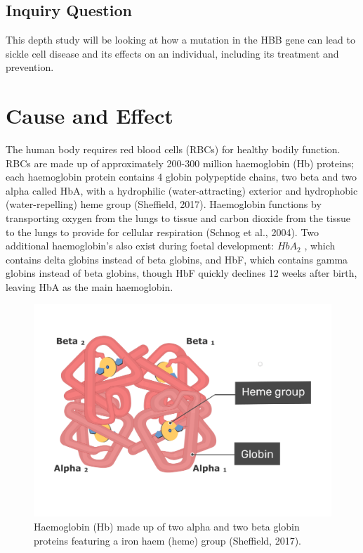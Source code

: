 \documentclass{mva_style}
\begin{document}
\subsection{Inquiry Question}
This depth study will be looking at how a mutation in the HBB gene can lead to sickle cell disease and its effects on an individual, including its treatment and prevention.

\section{Cause and Effect}
The human body requires red blood cells (RBCs) for healthy bodily function. RBCs are made up of approximately 200-300 million haemoglobin (Hb) proteins; each haemoglobin protein contains 4 globin polypeptide chains, two beta and two alpha called HbA, with a hydrophilic (water-attracting) exterior and hydrophobic (water-repelling) heme group (Sheffield, 2017). Haemoglobin functions by transporting oxygen from the lungs to tissue and carbon dioxide from the tissue to the lungs to provide for cellular respiration (Schnog et al., 2004).
Two additional haemoglobin's also exist during foetal development: \begin{math}HbA_{2}\end{math}
, which contains delta globins instead of beta globins, and HbF, which contains gamma globins instead of beta globins, though HbF quickly declines 12 weeks after birth, leaving HbA as the main haemoglobin. 

\begin{figure}
    \centering
    \includegraphics[width=0.8\linewidth]{img/Sheffield, 2017.png}
    \caption{Haemoglobin (Hb) made up of two alpha and two beta globin proteins featuring a iron haem (heme) group (Sheffield, 2017).}
    \label{fig:enter-label}
\end{figure}
\end{document}
